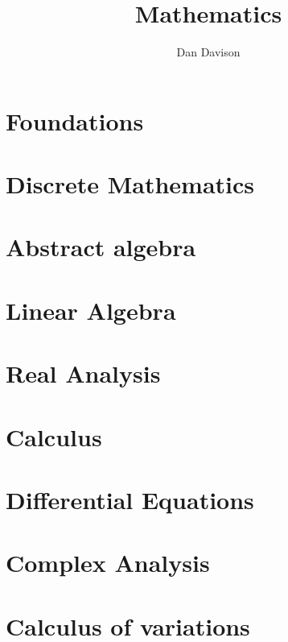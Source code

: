 \documentclass{book}
\title{Mathematics}
\author{Dan Davison}
\begin{document}
\frontmatter
\maketitle
\tableofcontents
\mainmatter


\chapter{Foundations}


\chapter{Discrete Mathematics}


\chapter{Abstract algebra}


\chapter{Linear Algebra}



\chapter{Real Analysis}


\chapter{Calculus}




\chapter{Differential Equations}


\chapter{Complex Analysis}




\chapter{Calculus of variations}

\end{document}
